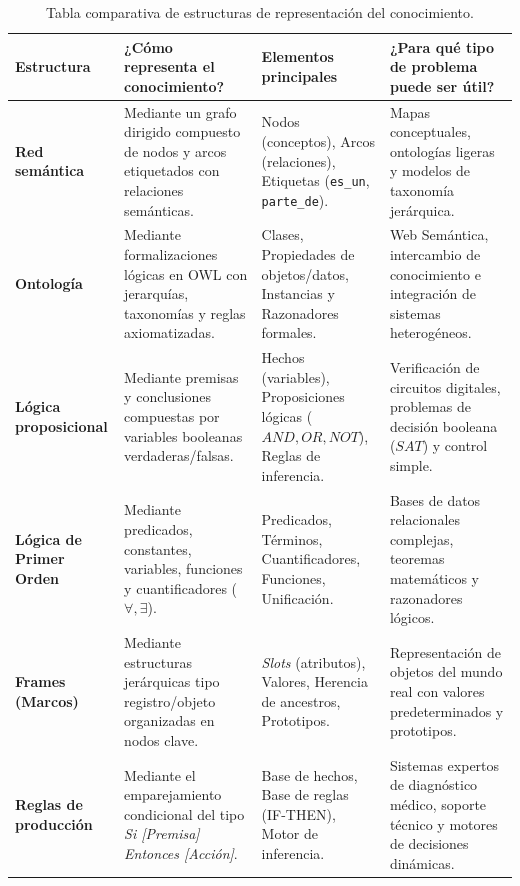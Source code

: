 \documentclass[11pt,letterpaper]{article}
\begin{document}
\begin{table}[H]
\centering\small
\renewcommand{\arraystretch}{1.2}
\begin{tabularx}{\linewidth}{@{} l X X X @{}}
\toprule
\textbf{Estructura} & \textbf{¿Cómo representa el conocimiento?} & \textbf{Elementos principales} & \textbf{¿Para qué tipo de problema puede ser útil?} \\
\midrule
\textbf{Red semántica} & Mediante un grafo dirigido compuesto de nodos y arcos etiquetados con relaciones semánticas. & Nodos (conceptos), Arcos (relaciones), Etiquetas (\texttt{es\_un}, \texttt{parte\_de}). & Mapas conceptuales, ontologías ligeras y modelos de taxonomía jerárquica. \\
\addlinespace
\textbf{Ontología} & Mediante formalizaciones lógicas en OWL con jerarquías, taxonomías y reglas axiomatizadas. & Clases, Propiedades de objetos/datos, Instancias y Razonadores formales. & Web Semántica, intercambio de conocimiento e integración de sistemas heterogéneos. \\
\addlinespace
\textbf{Lógica proposicional} & Mediante premisas y conclusiones compuestas por variables booleanas verdaderas/falsas. & Hechos (variables), Proposiciones lógicas ($AND, OR, NOT$), Reglas de inferencia. & Verificación de circuitos digitales, problemas de decisión booleana ($SAT$) y control simple. \\
\addlinespace
\textbf{Lógica de Primer Orden} & Mediante predicados, constantes, variables, funciones y cuantificadores ($\forall, \exists$). & Predicados, Términos, Cuantificadores, Funciones, Unificación. & Bases de datos relacionales complejas, teoremas matemáticos y razonadores lógicos. \\
\addlinespace
\textbf{Frames (Marcos)} & Mediante estructuras jerárquicas tipo registro/objeto organizadas en nodos clave. & \textit{Slots} (atributos), Valores, Herencia de ancestros, Prototipos. & Representación de objetos del mundo real con valores predeterminados y prototipos. \\
\addlinespace
\textbf{Reglas de producción} & Mediante el emparejamiento condicional del tipo \textit{Si [Premisa] Entonces [Acción]}. & Base de hechos, Base de reglas (IF-THEN), Motor de inferencia. & Sistemas expertos de diagnóstico médico, soporte técnico y motores de decisiones dinámicas. \\
\bottomrule
\end{tabularx}
\caption{Tabla comparativa de estructuras de representación del conocimiento.}
\label{tab:estructuras_conocimiento}
\end{table}
\end{document}
